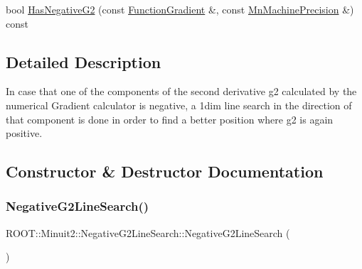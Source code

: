 \begin{DoxyCompactItemize}
\item 
bool \mbox{\hyperlink{classROOT_1_1Minuit2_1_1NegativeG2LineSearch_a5450b0e5a0144e9c3e6028e8ae4a2c76}{Has\+Negative\+G2}} (const \mbox{\hyperlink{classROOT_1_1Minuit2_1_1FunctionGradient}{Function\+Gradient}} \&, const \mbox{\hyperlink{classROOT_1_1Minuit2_1_1MnMachinePrecision}{Mn\+Machine\+Precision}} \&) const
\end{DoxyCompactItemize}


\subsection{Detailed Description}
In case that one of the components of the second derivative g2 calculated by the numerical Gradient calculator is negative, a 1dim line search in the direction of that component is done in order to find a better position where g2 is again positive. 

\subsection{Constructor \& Destructor Documentation}
\mbox{\label{classROOT_1_1Minuit2_1_1NegativeG2LineSearch_ac0cff4c81f89a72be26214633c14cd0e}} 
\subsubsection{\texorpdfstring{NegativeG2LineSearch()}{NegativeG2LineSearch()}\hspace{0.1cm}{\footnotesize\ttfamily [1/2]}}
{\footnotesize\ttfamily R\+O\+O\+T\+::\+Minuit2\+::\+Negative\+G2\+Line\+Search\+::\+Negative\+G2\+Line\+Search (\begin{DoxyParamCaption}{ }\end{DoxyParamCaption})\hspace{0.3cm}{\ttfamily [inline]}}

\mbox{\label{classROOT_1_1Minuit2_1_1NegativeG2LineSearch_a0ef5274da3c1466f321da0d596bf7a55}} 
